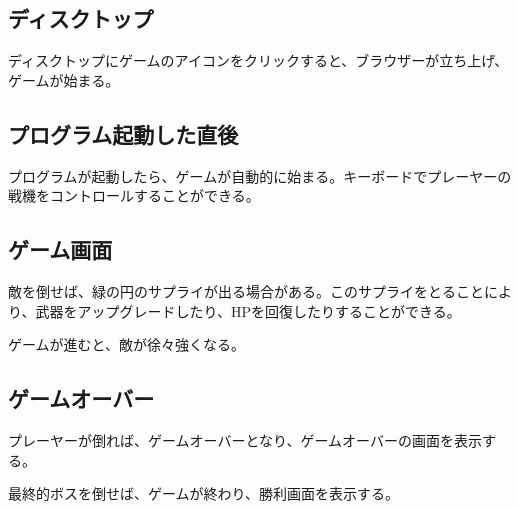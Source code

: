 \subsection{ディスクトップ}
	ディスクトップにゲームのアイコンをクリックすると、ブラウザーが立ち上げ、ゲームが始まる。
	
\subsection{プログラム起動した直後}
	プログラムが起動したら、ゲームが自動的に始まる。キーボードでプレーヤーの戦機をコントロールすることができる。
	
\subsection{ゲーム画面}
	敵を倒せば、緑の円のサプライが出る場合がある。このサプライをとることにより、武器をアップグレードしたり、HPを回復したりすることができる。
	
	ゲームが進むと、敵が徐々強くなる。
	
\subsection{ゲームオーバー}
	プレーヤーが倒れば、ゲームオーバーとなり、ゲームオーバーの画面を表示する。
	
	
	最終的ボスを倒せば、ゲームが終わり、勝利画面を表示する。
	
